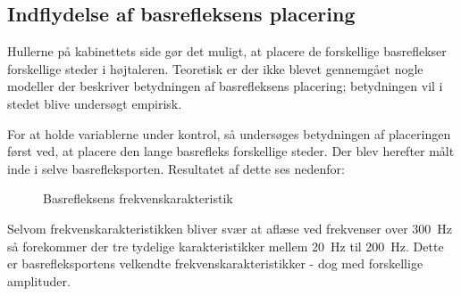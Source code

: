 \newpage
\subsection{Indflydelse af basrefleksens placering}
Hullerne på kabinettets side gør det muligt, at placere de forskellige basreflekser forskellige steder i højtaleren. Teoretisk er der ikke blevet gennemgået nogle modeller der beskriver betydningen af basrefleksens placering; betydningen vil i stedet blive undersøgt empirisk.

For at holde variablerne under kontrol, så undersøges betydningen af placeringen først ved, at placere den lange basrefleks forskellige steder. Der blev herefter målt inde i selve basrefleksporten. Resultatet af dette ses nedenfor:
\begin{figure}[H]
	\centering
	\vspace{-12pt}
	\caption{Basrefleksens frekvenskarakteristik}
\end{figure}

Selvom frekvenskarakteristikken bliver svær at aflæse ved frekvenser over \SI{300}{\hertz} så forekommer der tre tydelige karakteristikker mellem \SI{20}{\hertz} til \SI{200}{\hertz}. Dette er basrefleksportens velkendte frekvenskarakteristikker - dog med forskellige amplituder.